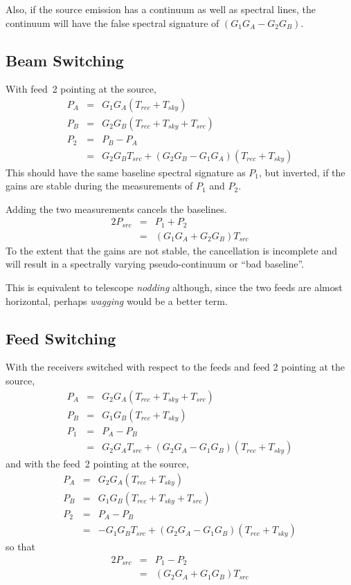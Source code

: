 \documentclass[a4paper,11pt]{article}
\begin{document}
Also, if the source emission has a continuum as well as spectral lines, the
continuum will have the false spectral signature of $(G_1 G_A - G_2 G_B)$.

\subsection{Beam Switching}

With feed~2 pointing at the source,
\begin{eqnarray*}
P_A &=& G_1 G_A ( T_{rec} + T_{sky}) \nonumber \\
P_B &=& G_2 G_B ( T_{rec} + T_{sky} + T_{src} ) \nonumber \\
P_2 &=& P_B - P_A \nonumber \\
    &=&  G_2 G_B T_{src} + (G_2 G_B - G_1 G_A)(T_{rec} + T_{sky}) \label{eqn:src-fd2}
\end{eqnarray*}
This should have the same baseline spectral signature as $P_1$, but inverted,
if the gains are stable during the measurements of $P_1$ and $P_2$.

Adding the two measurements cancels the baselines.
\begin{eqnarray}
2 P_{src} &=& P_1 + P_2 \nonumber \\
          &=& (G_1 G_A + G_2 G_B) T_{src} \label{eq:pos1}
\end{eqnarray}
To the extent that the gains are not stable, the cancellation is incomplete and
will result in a spectrally varying pseudo-continuum or ``bad baseline''.

This is equivalent to telescope {\it nodding} although, since the two feeds are
almost horizontal, perhaps {\it wagging} would be a better term.

\subsection{Feed Switching}\label{sec:feedsw}

With the receivers switched with respect to the feeds and feed 2 pointing at 
the source,
\begin{eqnarray*}
P_A &=& G_2 G_A ( T_{rec} + T_{sky} + T_{src} )\\
P_B &=& G_1 G_B ( T_{rec} + T_{sky} ) \\
P_1 &=& P_A - P_B \\
    &=& G_2 G_A T_{src} + (G_2 G_A - G_1 G_B)(T_{rec} + T_{sky})
\end{eqnarray*}
and with the feed~2 pointing at the source,
\begin{eqnarray*}
P_A &=& G_2 G_A ( T_{rec} + T_{sky}) \\
P_B &=& G_1 G_B ( T_{rec} + T_{sky} + T_{src} ) \\
P_2 &=& P_A - P_B \\
    &=& - G_1 G_B T_{src} + (G_2 G_A - G_1 G_B)(T_{rec} + T_{sky})
\end{eqnarray*}
so that
\begin{eqnarray}
2 P_{src} &=& P_1 - P_2 \nonumber \\
          &=& (G_2 G_A + G_1 G_B) T_{src} \label{eq:pos2}
\end{eqnarray}
\end{document}
